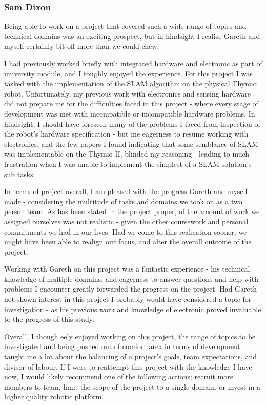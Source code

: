 \subsubsection{Sam Dixon}
Being able to work on a project that covered such a wide range of topics and
technical domains was an exciting prospect, but in hindsight I realise Gareth
and myself certainly bit off more than we could chew.

I had previously worked briefly with integrated hardware and electronic as
part of university module, and I toughly enjoyed the experience.
For this project I was tasked with the implementation of the SLAM algorithm on
the physical Thymio robot.
Unfortunately, my previous work with electronics and sensing hardware did not
prepare me for the difficulties faced in this project - where every stage of
development was met with incompatible or incompatible hardware problems.
In hindsight, I should have foreseen many of the problems I faced from
inspection of the robot's hardware specification - but me eagerness to resume
working with electronics, and the few papers I found indicating that some
semblance of SLAM was implementable on the Thymio II, blinded my reasoning -
leading to much frustration when I was unable to implement the simplest of
a SLAM solution's sub tasks.

In terms of project overall, I am pleased with the progress Gareth and myself
made - considering the multitude of tasks and domains we took on as a two
person team.
As has been stated in the project proper, of the amount of work we assigned
ourselves was not realistic - given the other coursework and personal
commitments we had in our lives.
Had we come to this realisation sooner, we might have been able to realign our
focus, and alter the overall outcome of the project.

Working with Gareth on this project was a fantastic experience - his technical
knowledge of multiple domains, and eagerness to answer questions and help
with problems I encounter greatly forwarded the progress on the project.
Had Gareth not shown interest in this project I probably would have considered a
topic for investigation - as his previous work and knowledge of electronic
proved invaluable to the progress of this study.

Overall, I though eely enjoyed working on this project, the range of topics to
be investigated and being pushed out of comfort area in terms of development
taught me a lot about the balancing of a project's goals, team expectations,
and divisor of labour.
If I were to reattempt this project with the knowledge I have now, I would
likely recommend one of the following actions; recruit more members to team,
limit the scope of the project to a single domain, or invest in a higher
quality robotic platform.

